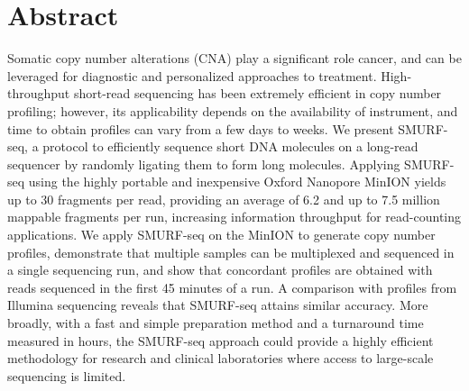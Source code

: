 \chapter*{Abstract}
Somatic copy number alterations (CNA) play a significant role cancer,
and can be leveraged for diagnostic and personalized approaches to
treatment.
%
High-throughput short-read sequencing has been extremely efficient in copy
number profiling; however, its applicability depends on the availability of
instrument, and time to obtain profiles can vary from a few days to weeks.
%
We present SMURF-seq, a protocol to efficiently sequence short DNA molecules
on a long-read sequencer by randomly ligating them to form long molecules.
Applying SMURF-seq using the highly portable and inexpensive Oxford Nanopore
MinION yields up to 30 fragments per read, providing an average of 6.2 and up
to 7.5 million mappable fragments per run, increasing information throughput
for read-counting applications. We apply SMURF-seq on the MinION to generate
copy number profiles, demonstrate that multiple samples can be multiplexed and
sequenced in a single sequencing run, and show that concordant profiles are
obtained with reads sequenced in the first 45 minutes of a run. A comparison
with profiles from Illumina sequencing reveals that SMURF-seq attains similar
accuracy.
%
More broadly, with a fast and simple preparation method and a turnaround time
measured in hours, the SMURF-seq approach could provide a highly efficient
methodology for research and clinical laboratories where access to large-scale
sequencing is limited.

